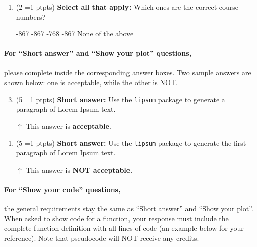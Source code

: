 \documentclass[11pt, letter, answers]{exam}
\newcommand{\pt}[1]{
    \small{(#1 \ifnum#1=1 pt\else pts\fi)}
    \normalsize
}
\newcommand{\sAll}{\textbf{Select all that apply: }}
\newcommand{\saq}{\textbf{Short answer: }}
\begin{document}
\begin{enumerate}[label={}]
\item \pt{2} \sAll Which ones are the correct course numbers?
{
\checkboxchar{$\Box$} \checkedchar{$\blacksquare$}
\begin{checkboxes}
    -867
    -867
    -768
    -867
    \checkboxchar{\xcancel{$\blacksquare$}{}} \choice None of the above
\end{checkboxes}
}
\end{enumerate}


\newpage
\paragraph{For ``Short answer'' and ``Show your plot'' questions,} please complete inside the corresponding answer boxes. Two sample answers are shown below: one is acceptable, while the other is NOT.

\begin{enumerate}
\setcounter{enumi}{2}
\item \pt{5} \saq Use the \texttt{lipsum} package to generate a paragraph of Lorem Ipsum text.

\begin{answerBox}[height=1.2in]
\lipsum[4]
\end{answerBox}

$\uparrow$ This answer is \textbf{acceptable}.
\end{enumerate}


\begin{enumerate}[label={}]
\item \pt{5} \saq Use the \texttt{lipsum} package to generate the first paragraph of Lorem Ipsum text.

\begin{tcolorbox}[height=1.2in, colback=white, sidebyside align=top, box align=top]
\lipsum[3]
\end{tcolorbox}

\vspace{2.5em}
{\color{red}$\uparrow$ This answer is \textbf{NOT acceptable}.}
\end{enumerate}


\paragraph{For ``Show your code'' questions,} the general requirements stay the same as ``Short answer'' and ``Show your plot''. When asked to show code for a function, your response must include the complete function definition with all lines of code (an example below for your reference). Note that pseudocode will NOT receive any credits.
\end{document}
